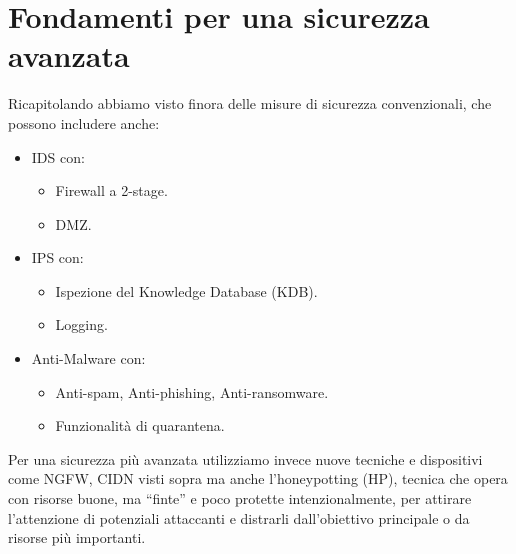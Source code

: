         \section{Fondamenti per una sicurezza avanzata}
            Ricapitolando abbiamo visto finora delle misure di sicurezza convenzionali, che possono includere anche:
            \begin{itemize}
                \item IDS con:
                    \begin{itemize}
                        \item Firewall a 2-stage.
                        \item DMZ.
                    \end{itemize}
                \item IPS con:
                    \begin{itemize}
                        \item Ispezione del Knowledge Database (KDB).
                        \item Logging.
                    \end{itemize}
                \item Anti-Malware con:
                    \begin{itemize}
                        \item Anti-spam, Anti-phishing, Anti-ransomware.
                        \item Funzionalità di quarantena.
                    \end{itemize}
            \end{itemize}

            Per una sicurezza più avanzata utilizziamo invece nuove tecniche e dispositivi come NGFW, CIDN visti sopra ma anche l'honeypotting (HP), tecnica che opera con risorse buone, ma “finte” e poco protette intenzionalmente, per attirare l'attenzione di potenziali attaccanti e distrarli dall'obiettivo principale o da risorse più importanti.

